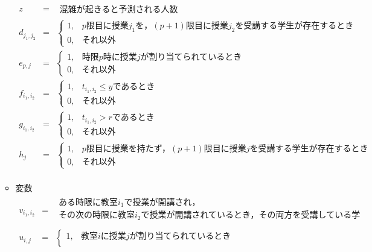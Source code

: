 \documentclass[12pt, a4paper, fleqn]{jreport}
\begin{document}
\begin{itemize}
\begin{itemize}
\[\begin{array}{rcl}
\\
z & = & 
\begin{array}{ll}
 \mbox{混雑が起きると予測される人数} 
\end{array}
\\
d_{j_1,j_2} & = & \left\{ 
\begin{array}{ll}
	1, & \mbox{$p$限目に授業$j_1$を，$(p+1)$限目に授業$j_2$を受講する学生が存在するとき} 		\\
	0, & \mbox{それ以外}
\end{array}
\right. \\
e_{p,j} & = & \left\{ 
\begin{array}{ll}
	1, & \mbox{時限$p$時に授業$j$が割り当てられているとき} 		\\
	0, & \mbox{それ以外}
\end{array}
\right. \\
f_{i_1,i_2} & = & \left\{ 
\begin{array}{ll}
1, & \mbox{$t_{i_1,i_2}\leq y$であるとき} \\
0, & \mbox{それ以外}
\end{array}
\right.\\
g_{i_1,i_2} & = & \left\{ 
\begin{array}{ll}
1, & \mbox{$t_{i_1,i_2}>r$であるとき} \\
0, & \mbox{それ以外}
\end{array}
\right.\\
h_{j} & = & \left\{ 
\begin{array}{ll}
1, & \mbox{$p$限目に授業を持たず，$(p+1)$限目に授業$j$を受講する学生が存在するとき} \\
0, & \mbox{それ以外}
\end{array}
\right.\\
\end{array}
\]
\vspace{3.0mm}
\item 変数\\
\vspace{-5.0mm}
\[
\begin{array}{rcl}
v_{i_1,i_2} & = & 
\begin{array}{ll}
\mbox{ある時限に教室$i_1$で授業が開講され，}\\
\mbox{その次の時限に教室$i_2$で授業が開講されているとき，その両方を受講している学生数}\\ 
\end{array}
\\
 u_{i,j} & = & \left\{ 
\begin{array}{ll}
1, & \mbox{教室$i$に授業$j$が割り当てられているとき} \\

\end{array}
\end{array}\]
\end{itemize}
\end{itemize}
\end{document}
